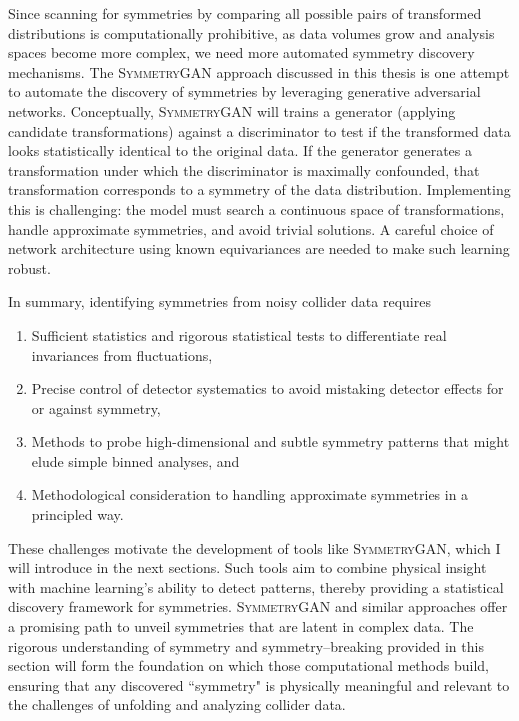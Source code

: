             Since scanning for symmetries by comparing all possible pairs of transformed distributions is computationally prohibitive, as data volumes grow and analysis spaces become more complex, we need more automated symmetry discovery mechanisms.
            The \textsc{SymmetryGAN} approach discussed in this thesis is one attempt to automate the discovery of symmetries by leveraging generative adversarial networks.
            Conceptually, \textsc{SymmetryGAN} will trains a generator (applying candidate transformations) against a discriminator to test if the transformed data looks statistically identical to the original data.
            If the generator generates a transformation under which the discriminator is maximally confounded, that transformation corresponds to a symmetry of the data distribution.
            Implementing this is challenging: the model must search a continuous space of transformations, handle approximate symmetries, and avoid trivial solutions.
            A careful choice of network architecture using known equivariances are needed to make such learning robust.

            In summary, identifying symmetries from noisy collider data requires
            \begin{enumerate}
                \item Sufficient statistics and rigorous statistical tests to differentiate real invariances from fluctuations,
                \item Precise control of detector systematics to avoid mistaking detector effects for or against symmetry,
                \item Methods to probe high-dimensional and subtle symmetry patterns that might elude simple binned analyses, and
                \item Methodological consideration to handling approximate symmetries in a principled way.
            \end{enumerate}
            These challenges motivate the development of tools like \textsc{SymmetryGAN}, which I will introduce in the next sections.
            Such tools aim to combine physical insight with machine learning's ability to detect patterns, thereby providing a statistical discovery framework for symmetries.
            \textsc{SymmetryGAN} and similar approaches offer a promising path to unveil symmetries that are latent in complex data.
            The rigorous understanding of symmetry and symmetry--breaking provided in this section will form the foundation on which those computational methods build, ensuring that any discovered ``symmetry" is physically meaningful and relevant to the challenges of unfolding and analyzing collider data.

